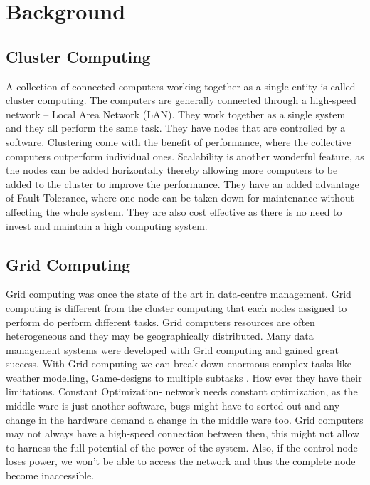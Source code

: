 \documentclass[a4paper,12pt]{Classes/RoboticsLaTeX}
\begin{document}
	
	\chapter{Background}
	\label{chap:backg}

    \section{Cluster Computing} 

    A collection of connected computers working together as a single entity is called cluster computing. The computers are generally connected through a high-speed network – Local Area Network (LAN). They work together as a single system and they all perform the same task. They have nodes that are controlled by a software\cite{baker1999cluster}.
    Clustering come with the benefit of performance, where the collective computers outperform individual ones. Scalability is another wonderful feature, as the nodes can be added horizontally thereby allowing more computers to be added to the cluster to improve the performance. They have an added advantage of Fault Tolerance, where one node can be taken down for maintenance without affecting the whole system. They are also cost effective as there is no need to invest and maintain a high computing system.

    \section{Grid Computing} 
	Grid computing was once the state of the art in data-centre management. Grid computing is different from the cluster computing that each nodes assigned to perform do perform different tasks. Grid computers resources are often heterogeneous and they may be geographically distributed. Many data management systems were developed with Grid computing and gained great success. With Grid computing we can break down enormous complex tasks like weather modelling, Game-designs to multiple subtasks \cite{amazonWhatGrid}. How ever they have their limitations. Constant Optimization- network needs constant optimization, as the middle ware is just another software, bugs might have to sorted out and any change in the hardware demand a change in the middle ware too. Grid computers may not always have a high-speed connection between then, this might not allow to harness the full potential of the power of the system. Also, if the control node loses power, we won’t be able to access the network and thus the complete node become inaccessible.
\end{document}
